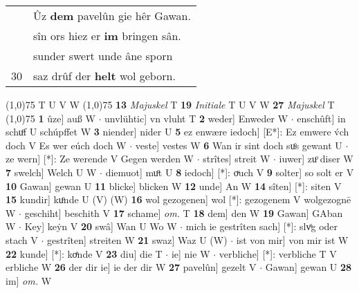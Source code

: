 \documentclass[8pt,a4paper,notitlepage]{article}
\begin{document}
\begin{table}[ht]
\begin{minipage}[t]{0.5\linewidth}
\begin{tabular}{rl}
 & Ûz \textbf{dem} pavelûn gie hêr Gawan.\\ 
 & sîn ors hiez er \textbf{im} bringen sân.\\ 
 & sunder swert unde âne sporn\\ 
30 & saz drûf der \textbf{helt} wol geborn.\\ 
\end{tabular}
\scriptsize
\line(1,0){75} \newline
T U V W \newline
\line(1,0){75} \newline
\textbf{13} \textit{Majuskel} T  \textbf{19} \textit{Initiale} T U V W  \textbf{27} \textit{Majuskel} T  \newline
\line(1,0){75} \newline
\textbf{1} ûze] auß W  $\cdot$ unvlühtic] vn vluht T \textbf{2} weder] Enweder W  $\cdot$ enschûft] in schuͦf U schúpffet W \textbf{3} niender] nider U \textbf{5} ez enwære iedoch] [E*]: Ez emwere v́ch doch V Es wer eúch doch W  $\cdot$ veste] vestes W \textbf{6} Wan ir sint doch suͦs gewant U  $\cdot$ ze wern] [*]: Ze werende V Gegen werden W  $\cdot$ strîtes] streit W  $\cdot$ iuwer] zuͦ diser W \textbf{7} swelch] Welch U W  $\cdot$ diemuot] muͦt U \textbf{8} iedoch] [*]: oͮuch V \textbf{9} solter] so solt er V \textbf{10} Gawan] gewan U \textbf{11} blicke] blicken W \textbf{12} unde] An W \textbf{14} sîten] [*]: siten V \textbf{15} kundir] kuͦnde U (V) (W) \textbf{16} wol gezogenen] wol [*]: gezogenem V wolgezognē W  $\cdot$ geschiht] beschith V \textbf{17} schame] \textit{om.} T \textbf{18} dem] den W \textbf{19} Gawan] GAban W  $\cdot$ Key] keẏn V \textbf{20} swâ] Wan U Wo W  $\cdot$ mich ie gestrîten sach] [*]: slvͦg oder stach V  $\cdot$ gestrîten] streiten W \textbf{21} swaz] Waz U (W)  $\cdot$ ist von mir] von mir ist W \textbf{22} kunde] [*]: koͤnde V \textbf{23} diu] die T  $\cdot$ ie] nie W  $\cdot$ verbliche] [*]: verbliche T V erbliche W \textbf{26} der dir ie] ie der dir W \textbf{27} pavelûn] gezelt V  $\cdot$ Gawan] gewan U \textbf{28} im] \textit{om.} W \newline
\end{minipage}
\end{table}
\end{document}
